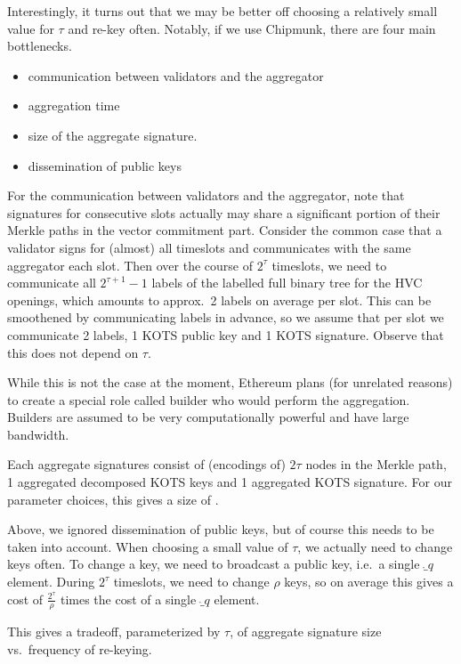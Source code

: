 Interestingly, it turns out that we may be better off choosing a relatively small value for $\tau$ and re-key often. Notably, if we use Chipmunk, there are four main bottlenecks.
\begin{itemize}
\item communication between validators and the aggregator
\item aggregation time
\item size of the aggregate signature.
\item dissemination of public keys
\end{itemize}
For the communication between validators and the aggregator, note that signatures for consecutive slots actually may share a significant portion of their Merkle paths in the vector commitment part.
Consider the common case that a validator signs for (almost) all timeslots and communicates with the same aggregator each slot.
Then over the course of $2^\tau$ timeslots, we need to communicate all $2^{\tau+1} - 1$ labels of the labelled full binary tree for the HVC openings, which amounts to approx.\ 2 labels on average per slot.
This can be smoothened by communicating labels in advance, so we assume that per slot we communicate 2 labels, 1 KOTS public key and 1 KOTS signature.
Observe that this does not depend on $\tau$.

While this is not the case at the moment, Ethereum plans (for unrelated reasons) to create a special role called builder who would perform the aggregation. Builders are assumed to be very computationally powerful and have large bandwidth.

Each aggregate signatures consist of (encodings of) $2\tau$ nodes in the Merkle path, 1 aggregated decomposed KOTS keys and 1 aggregated KOTS signature.
For our parameter choices, this gives a size of .

\bigskip
Above, we ignored dissemination of public keys, but of course this needs to be taken into account.
When choosing a small value of $\tau$, we actually need to change keys often.
To change a key, we need to broadcast a public key, i.e.\ a single $\ring_q$ element.
During $2^\tau$ timeslots, we need to change $\rho$ keys, so on average this gives a cost of $\frac{2^\tau}{\rho}$ times the cost of a single $\ring_q$ element.

This gives a tradeoff, parameterized by $\tau$, of aggregate signature size vs.\ frequency of re-keying.

